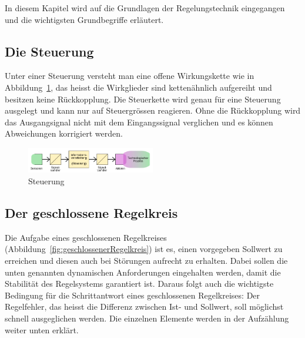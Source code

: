 In diesem Kapitel wird auf die Grundlagen der Regelungstechnik eingegangen und
die wichtigsten Grundbegriffe erl\"autert.

\subsection{Die Steuerung}

Unter  einer   Steuerung  versteht  man   eine  offene Wirkungskette   wie  in
Abbildung~\ref{fig:Steuerung}, das heisst die Wirkglieder sind ketten\"ahnlich
aufgereiht und besitzen keine R\"uckkopplung. Die Steuerkette wird genau f\"ur
eine Steuerung ausgelegt und kann  nur auf Steuergr\"ossen reagieren. Ohne die
R\"uckkopplung wird das Ausgangsignal  nicht mit dem Eingangssignal verglichen
und es k\"onnen Abweichungen korrigiert werden.

\begin{figure}[!h!, width=\pagewidth]
    \centering
    \includegraphics[width=0.5\textwidth]{images/Steuerung}
    \caption{Steuerung}
    \label{fig:Steuerung}
\end{figure}


\subsection{Der geschlossene Regelkreis}
\label{subs:grundl:geschlossenerRegelkreis}
Die          Aufgabe         eines          geschlossenen         Regelkreises
(Abbildung~\ref{fig:geschlossenerRegelkreis})   ist   es,   einen   vorgegeben
Sollwert  zu   erreichen  und   diesen  auch   bei  St\"orungen   aufrecht  zu
erhalten. Dabei   sollen  die   unten   genannten  dynamischen   Anforderungen
eingehalten  werden,  damit  die   Stabilit\"at  des  Regelsystems  garantiert
ist. Daraus  folgt  auch die  wichtigste  Bedingung  f\"ur die  Schrittantwort
eines geschlossenen  Regelkreises: Der Regelfehler,  das heisst  die Differenz
zwischen Ist- und Sollwert, soll m\"oglichst schnell ausgeglichen werden.  Die
einzelnen Elemente werden in der Aufz\"ahlung weiter unten erkl\"art.



